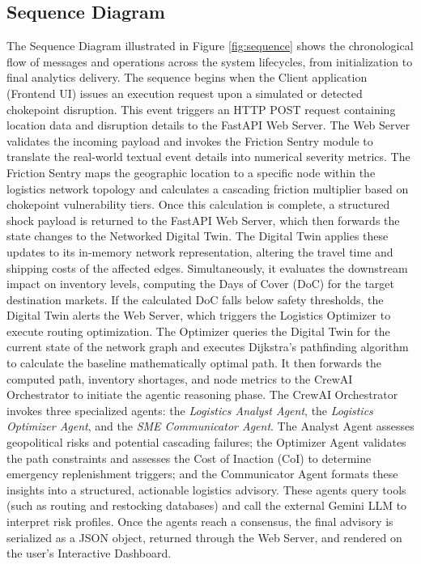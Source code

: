 \subsection[Sequence Diagram]{Sequence Diagram}
The Sequence Diagram illustrated in Figure \ref{fig:sequence} shows the chronological flow of messages and operations across the system lifecycles, from initialization to final analytics delivery. The sequence begins when the Client application (Frontend UI) issues an execution request upon a simulated or detected chokepoint disruption. This event triggers an HTTP POST request containing location data and disruption details to the FastAPI Web Server. The Web Server validates the incoming payload and invokes the Friction Sentry module to translate the real-world textual event details into numerical severity metrics. The Friction Sentry maps the geographic location to a specific node within the logistics network topology and calculates a cascading friction multiplier based on chokepoint vulnerability tiers. Once this calculation is complete, a structured shock payload is returned to the FastAPI Web Server, which then forwards the state changes to the Networked Digital Twin. The Digital Twin applies these updates to its in-memory network representation, altering the travel time and shipping costs of the affected edges. Simultaneously, it evaluates the downstream impact on inventory levels, computing the Days of Cover (DoC) for the target destination markets. If the calculated DoC falls below safety thresholds, the Digital Twin alerts the Web Server, which triggers the Logistics Optimizer to execute routing optimization. The Optimizer queries the Digital Twin for the current state of the network graph and executes Dijkstra's pathfinding algorithm to calculate the baseline mathematically optimal path. It then forwards the computed path, inventory shortages, and node metrics to the CrewAI Orchestrator to initiate the agentic reasoning phase. The CrewAI Orchestrator invokes three specialized agents: the \textit{Logistics Analyst Agent}, the \textit{Logistics Optimizer Agent}, and the \textit{SME Communicator Agent}. The Analyst Agent assesses geopolitical risks and potential cascading failures; the Optimizer Agent validates the path constraints and assesses the Cost of Inaction (CoI) to determine emergency replenishment triggers; and the Communicator Agent formats these insights into a structured, actionable logistics advisory. These agents query tools (such as routing and restocking databases) and call the external Gemini LLM to interpret risk profiles. Once the agents reach a consensus, the final advisory is serialized as a JSON object, returned through the Web Server, and rendered on the user's Interactive Dashboard.

